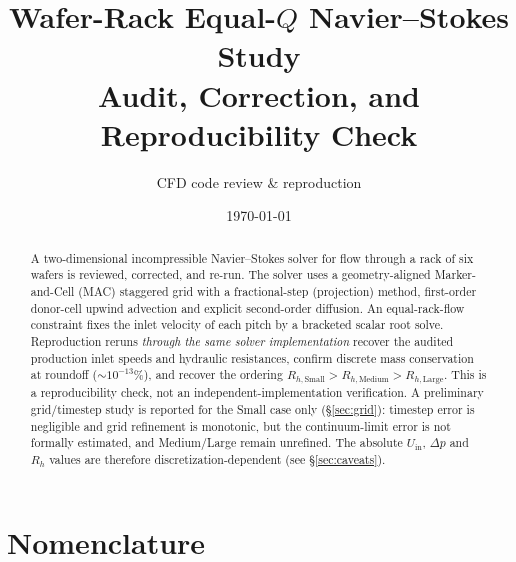 \documentclass[11pt]{article}
\title{\textbf{Wafer-Rack Equal-$Q$ Navier--Stokes Study}\\[2pt]
\large Audit, Correction, and Reproducibility Check}
\author{CFD code review \& reproduction}
\date{\today}
\begin{document}
\maketitle
\thispagestyle{empty}

\begin{abstract}
A two-dimensional incompressible Navier--Stokes solver for flow through a rack
of six wafers is reviewed, corrected, and re-run. The solver uses
a geometry-aligned Marker-and-Cell (MAC) staggered grid with a fractional-step
(projection) method, first-order donor-cell upwind advection and explicit
second-order diffusion. An equal-rack-flow constraint fixes the inlet velocity
of each pitch by a bracketed scalar root solve. Reproduction reruns
\emph{through the same solver implementation} recover the audited production
inlet speeds and hydraulic resistances, confirm discrete mass conservation at
roundoff ($\sim\!10^{-13}\%$), and recover the ordering
$R_{h,\mathrm{Small}}>R_{h,\mathrm{Medium}}>R_{h,\mathrm{Large}}$. This is a
reproducibility check, not an independent-implementation verification. A
preliminary grid/timestep study is reported for the Small case only
(\S\ref{sec:grid}): timestep error is negligible and grid refinement is
monotonic, but the continuum-limit error is not formally estimated, and
Medium/Large remain unrefined. The absolute $U_\mathrm{in}$, $\Delta p$ and
$R_h$ values are therefore discretization-dependent (see \S\ref{sec:caveats}).
\end{abstract}

\section*{Nomenclature}
\end{document}
